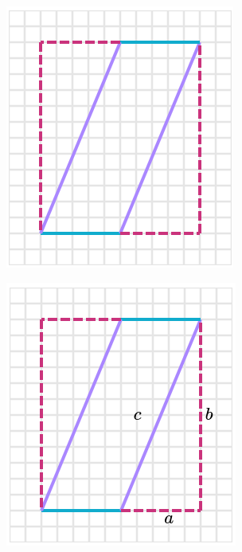 \begin{solutionbox}{14cm}
    \begin{minipage}{0.4\textwidth}
        \begin{multicols}{2}
            \begin{figure}[H]
                \centering
                \includegraphics[width=0.9\linewidth]{../images/peri_paralelogramo_03a.png}
                \caption{}
                \label{fig:peri_paralelogramo_03a}
            \end{figure}
            \begin{figure}[H]
                \centering
                \includegraphics[width=0.9\linewidth]{../images/peri_paralelogramo_03b.png}

\end{figure}
\end{multicols}
\end{minipage}
\end{solutionbox}
